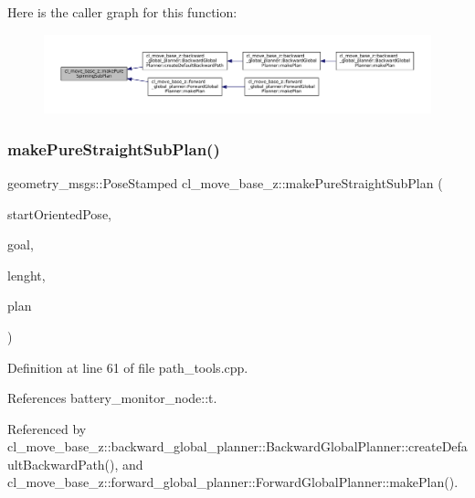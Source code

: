 Here is the caller graph for this function\+:
\nopagebreak
\begin{figure}[H]
\begin{center}
\leavevmode
\includegraphics[width=350pt]{namespacecl__move__base__z_ac774e138510eb7b5e0015be1f7709e19_icgraph}
\end{center}
\end{figure}
\mbox{\label{namespacecl__move__base__z_a1d6998cc28a1847906272f2bf92bacc8}} 
\subsubsection{\texorpdfstring{make\+Pure\+Straight\+Sub\+Plan()}{makePureStraightSubPlan()}}
{\footnotesize\ttfamily geometry\+\_\+msgs\+::\+Pose\+Stamped cl\+\_\+move\+\_\+base\+\_\+z\+::make\+Pure\+Straight\+Sub\+Plan (\begin{DoxyParamCaption}\item[{const geometry\+\_\+msgs\+::\+Pose\+Stamped \&}]{start\+Oriented\+Pose,  }\item[{const geometry\+\_\+msgs\+::\+Point \&}]{goal,  }\item[{double}]{lenght,  }\item[{std\+::vector$<$ geometry\+\_\+msgs\+::\+Pose\+Stamped $>$ \&}]{plan }\end{DoxyParamCaption})}



Definition at line 61 of file path\+\_\+tools.\+cpp.



References battery\+\_\+monitor\+\_\+node\+::t.



Referenced by cl\+\_\+move\+\_\+base\+\_\+z\+::backward\+\_\+global\+\_\+planner\+::\+Backward\+Global\+Planner\+::create\+Default\+Backward\+Path(), and cl\+\_\+move\+\_\+base\+\_\+z\+::forward\+\_\+global\+\_\+planner\+::\+Forward\+Global\+Planner\+::make\+Plan().


